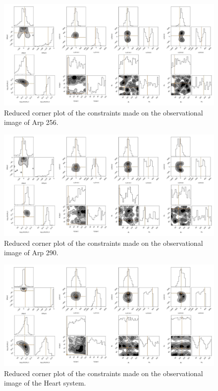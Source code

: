 \begin{figure}
\centering
\includegraphics[width=\textwidth]{Chapter1/figures/Arp256-obs-red-corner.pdf}
\caption[Reduced corner plot of the constraints made on the observational image of Arp 256.]{Reduced corner plot of the constraints made on the observational image of Arp 256.}
\label{fig:Arp290-obs}
\end{figure}

\begin{figure}
\centering
\includegraphics[width=\textwidth]{Chapter1/figures/Arp290-obs-red-corner.pdf}
\caption[Reduced corner plot of the constraints made on the observational image of Arp 290.]{Reduced corner plot of the constraints made on the observational image of Arp 290. }
\label{fig:Arp256-obs}
\end{figure}

\begin{figure}
\centering
\includegraphics[width=\textwidth]{Chapter1/figures/Heart-obs-red-corner.pdf}
\caption[Reduced corner plot of the constraints made on the observational image of the Heart system.]{Reduced corner plot of the constraints made on the observational image of the Heart system.}
\label{fig:Heart-obs}
\end{figure}

